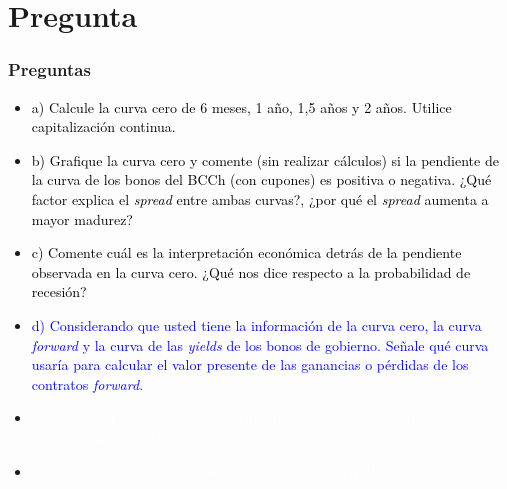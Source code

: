 \documentclass{beamer}
\begin{document}
\section{Pregunta }
\begin{frame}
  \frametitle{Preguntas}
  \begin{itemize}
    \scriptsize
    \item {\textcolor{black}{a) Calcule la curva cero de 6 meses, 1 año, 1,5 años y 2 años. Utilice capitalización continua.}}
    \vspace{3pt}
    \item {\textcolor{black}{b) Grafique la curva cero y comente (sin realizar cálculos) si la pendiente de la curva de los bonos del BCCh (con cupones) es positiva o negativa. ¿Qué factor explica el \textit{spread} entre ambas curvas?, ¿por qué el \textit{spread} aumenta a mayor madurez?}}
    \vspace{3pt}
    \item {\textcolor{black}{c) Comente cuál es la interpretación económica detrás de la pendiente observada en la curva cero. ¿Qué nos dice respecto a la probabilidad de recesión?}}
    \vspace{3pt}
    \item {\Large\textcolor{blue}{d) Considerando que usted tiene la información de la curva cero, la curva \textit{forward} y la curva de las \textit{yields} de los bonos de gobierno. Señale qué curva usaría para calcular el valor presente de las ganancias o pérdidas de los contratos \textit{forward}.}}
    \vspace{3pt}
    \item {\textcolor{white}{e) ¿Cuál es el rol de las probabilidades neutrales al riesgo en d)?, ¿qué rol juega la condición de no arbitraje?}}
    \vspace{3pt}
    \item {\textcolor{white}{f) Calcule el punto a) utilizando matrices en Excel/R/Python.}}
    \vspace{3pt}
  \end{itemize}
\end{frame}
\end{document}
